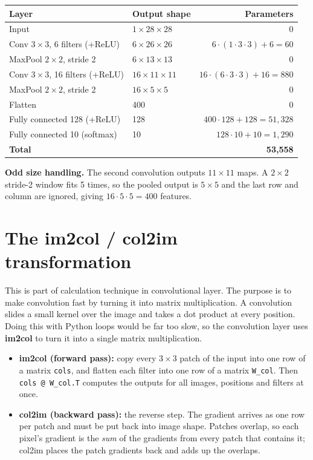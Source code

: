 \documentclass[11pt,a4paper]{article}
\newcommand{\code}[1]{\texttt{#1}}
\begin{document}
\begin{table}[H]
\centering
\begin{tabular}{@{}llr@{}}
\toprule
\textbf{Layer} & \textbf{Output shape} & \textbf{Parameters} \\
\midrule
Input & $1{\times}28{\times}28$ & 0 \\
Conv $3{\times}3$, 6 filters (+ReLU) & $6{\times}26{\times}26$ & $6\cdot(1\cdot3\cdot3)+6=60$ \\
MaxPool $2{\times}2$, stride 2 & $6{\times}13{\times}13$ & 0 \\
Conv $3{\times}3$, 16 filters (+ReLU) & $16{\times}11{\times}11$ & $16\cdot(6\cdot3\cdot3)+16=880$ \\
MaxPool $2{\times}2$, stride 2 & $16{\times}5{\times}5$ & 0 \\
Flatten & 400 & 0 \\
Fully connected 128 (+ReLU) & 128 & $400\cdot128+128=51{,}328$ \\
Fully connected 10 (softmax) & 10 & $128\cdot10+10=1{,}290$ \\
\midrule
\textbf{Total} & & \textbf{53,558} \\
\bottomrule
\end{tabular}
\end{table}

\textbf{Odd size handling.} The second convolution outputs $11{\times}11$ maps. A $2{\times}2$ stride-2 window fits 5 times, so the pooled output is $5{\times}5$ and the last row and column are ignored, giving $16\cdot5\cdot5=400$ features.

\section{The im2col / col2im transformation}
This is part of calculation technique in convolutional layer. The purpose is to make convolution fast by turning it into matrix multiplication. A convolution slides a small kernel over the image and takes a dot product at every position. Doing this with Python loops would be far too slow, so the convolution layer uses \textbf{im2col} to turn it into a single matrix multiplication.

\begin{itemize}
  \item \textbf{im2col (forward pass):} copy every $3{\times}3$ patch of the input into one row of a matrix \code{cols}, and flatten each filter into one row of a matrix \code{W\_col}. Then \code{cols @ W\_col.T} computes the outputs for all images, positions and filters at once.
  \item \textbf{col2im (backward pass):} the reverse step. The gradient arrives as one row per patch and must be put back into image shape. Patches overlap, so each pixel's gradient is the \emph{sum} of the gradients from every patch that contains it; col2im places the patch gradients back and adds up the overlaps.
\end{itemize}
\end{document}
